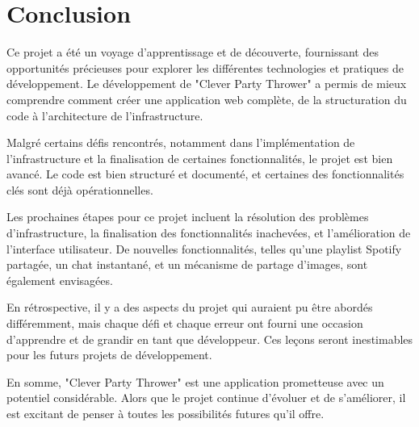 \documentclass[12pt, a4paper, oneside]{article}
\begin{document}
    \section{Conclusion}\label{sec:conclusion}

    Ce projet a été un voyage d'apprentissage et de découverte,
    fournissant des opportunités précieuses pour explorer les différentes technologies et pratiques de développement.
    Le développement de "Clever Party Thrower" a permis de mieux comprendre comment créer une application web complète,
    de la structuration du code à l'architecture de l'infrastructure.

    Malgré certains défis rencontrés, notamment dans l'implémentation de l'infrastructure et la finalisation de certaines fonctionnalités,
    le projet est bien avancé.
    Le code est bien structuré et documenté, et certaines des fonctionnalités clés sont déjà opérationnelles.

    Les prochaines étapes pour ce projet incluent la résolution des problèmes d'infrastructure,
    la finalisation des fonctionnalités inachevées, et l'amélioration de l'interface utilisateur.
    De nouvelles fonctionnalités, telles qu'une playlist Spotify partagée, un chat instantané,
    et un mécanisme de partage d'images, sont également envisagées.

    En rétrospective, il y a des aspects du projet qui auraient pu être abordés différemment,
    mais chaque défi et chaque erreur ont fourni une occasion d'apprendre et de grandir en tant que développeur.
    Ces leçons seront inestimables pour les futurs projets de développement.

    En somme, "Clever Party Thrower" est une application prometteuse avec un potentiel considérable.
    Alors que le projet continue d'évoluer et de s'améliorer, il est excitant de penser à toutes les possibilités futures qu'il offre.





    \newpage
    \printbibliography
\end{document}
